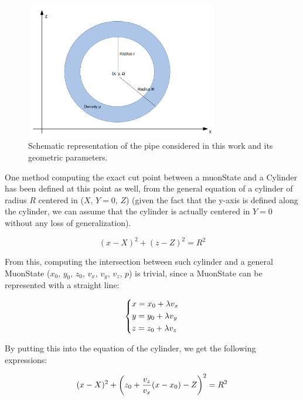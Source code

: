 \documentclass[a4paper, 11pt]{report}
\begin{document}
\begin{figure}[htbp]
\centering
\begin{minipage}[b]{.49\textwidth}
\includegraphics[width=8.5cm, height=6cm]{figs/cylinder.png}
\end{minipage}\hfill
\caption{Schematic representation of the pipe considered in this work and its geometric parameters.}
\label{fig:cylinder}
\end{figure}

One method computing the exact cut point between a muonState and a Cylinder has been defined at this point as well, from the general equation of a cylinder of radius $R$ centered in ($X$, $Y = 0$, $Z$) (given the fact that the y-axis is defined along the cylinder, we can assume that the cylinder is actually centered in $Y = 0$ without any loss of generalization).

\begin{equation}
\label{eq:cylinder}
(x - X)^2 + (z - Z)^2 = R^2
\end{equation}

From this, computing the intersection between such cylinder and a general MuonState ($x_0$, $y_0$, $z_0$, $v_{x}$, $v_{y}$, $v_{z}$, $p$) is trivial, since a MuonState can be represented with a straight line: 

\begin{equation}
\label{eq:line}
\begin{dcases}
x = x_0 + \lambda v_x \\
y = y_0 + \lambda v_y \\
z = z_0 + \lambda v_z
\end{dcases}
\end{equation}

By putting this into the equation of the cylinder, we get the following expressions:

\begin{equation}
\label{eq:together}
(x - X)^2 + \left (z_0 + \frac{v_z}{v_x} (x - x_0) - Z \right )^2 = R^2 \\
\end{equation}
\end{document}
